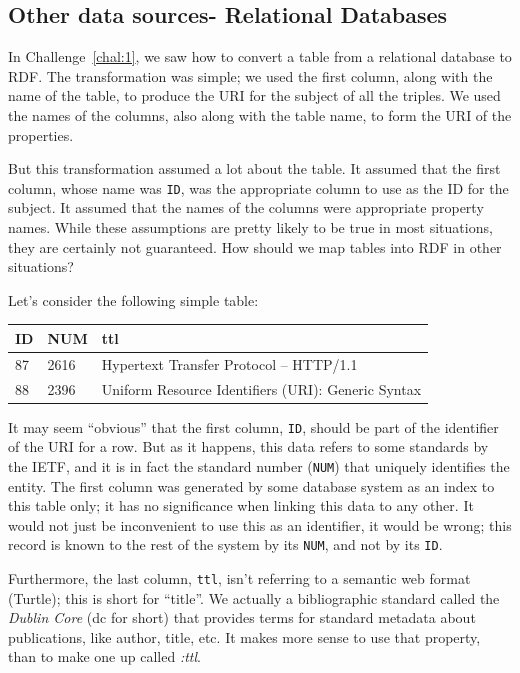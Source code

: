 \subsection{Other data sources- Relational Databases}

In Challenge~\ref{chal:1}, we saw how to convert a table from a relational
database to RDF. The transformation was simple; we used the first column, along
with the name of the table, to produce the URI for the subject of all the 
triples.  We used the names of the columns, also along with the table 
name, to form the URI of the properties.

But this transformation assumed a lot about the table.  It assumed that the
first column, whose name was \texttt{ID}, was the appropriate column to use
as the ID for the subject.  It assumed that the names of the columns were
appropriate property names.  While these assumptions are pretty likely to 
be true in most situations, they are certainly not guaranteed.  How should we
map tables into RDF in other situations? 

Let's consider the following simple table:

\phantom{I}

\begin{tabular}{|lll|}
\hline
ID&NUM &ttl \\
\hline
\hline
87&2616&Hypertext Transfer Protocol -- HTTP/1.1 \\
88&2396&Uniform Resource Identifiers (URI): Generic Syntax\\
     \hline
\end{tabular}

It may seem ``obvious'' that the first column, \texttt{ID}, should be part
of the identifier of the URI for a row.  But as it happens, this data refers to
some standards by the IETF, and it is in fact the standard number (\texttt{NUM}) that 
uniquely  identifies the entity.   The first column was generated by some database
system as an index to this table only; it has no significance when linking this data
to any other.  It would not just be inconvenient to use this as an identifier, it would be
wrong; this record is known to the rest of the system by its \texttt{NUM}, 
and not by its \texttt{ID}.

Furthermore, the last column, \texttt{ttl}, isn't referring to a semantic web format (Turtle);
this is short for ``title''.  We actually a bibliographic standard called 
the \emph{Dublin Core} (dc for short) that provides terms for standard metadata about
publications, like author, title, etc.  It makes more sense to use that property, than to
make one up called \emph{:ttl}.  

